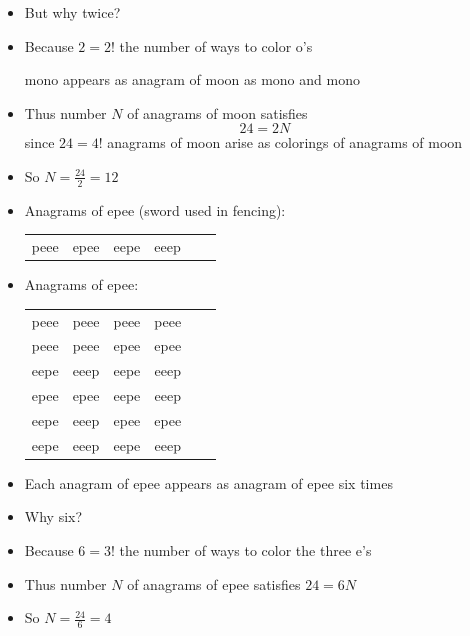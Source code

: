 \documentclass[handout]{beamer}
\theoremstyle{definition}
\begin{document}
\begin{frame}
\begin{itemize}
\item But why twice?
\item Because $2=2!$ the number of ways to color o's
\begin{example} mono appears as anagram of mo\alert{o}n
as mon\alert{o} and m\alert{o}no
\end{example}
\item Thus number $N$ of anagrams of moon satisfies
\[24=2N\]
since $24=4!$ anagrams of mo\alert{o}n arise as colorings of
anagrams of moon
\item So $N=\frac{24}{2}=12$
\end{itemize}
\end{frame}

\begin{frame}
\begin{itemize}
\item Anagrams of epee (sword used in fencing):\\
\begin{tabular}{cccccc}
peee&epee&eepe&eeep
\end{tabular}
\item Anagrams of ep{\color{red}e}{\color{blue}e}:\\
\begin{tabular}{cccccc}
pe{\color{red}e}{\color{blue}e}&pe{\color{blue}e}{\color{red}e}&p{\color{red}e}e{\color{blue}e}&p{\color{red}e}{\color{blue}e}e\\
p{\color{blue}e}e{\color{red}e}&p{\color{blue}e}{\color{red}e}e&ep{\color{red}e}{\color{blue}e}&ep{\color{blue}e}{\color{red}e}\\
e{\color{red}e}p{\color{blue}e}&e{\color{red}e}{\color{blue}e}p&e{\color{blue}e}p{\color{red}e}&e{\color{blue}e}{\color{red}e}p\\
{\color{red}e}pe{\color{blue}e}&{\color{red}e}p{\color{blue}e}e&{\color{red}e}ep{\color{blue}e}&{\color{red}e}e{\color{blue}e}p\\
{\color{red}e}{\color{blue}e}pe&{\color{red}e}{\color{blue}e}ep&{\color{blue}e}pe{\color{red}e}&{\color{blue}e}p{\color{red}e}e\\
{\color{blue}e}ep{\color{red}e}&{\color{blue}e}e{\color{red}e}p&{\color{blue}e}{\color{red}e}pe&{\color{blue}e}{\color{red}e}ep
\end{tabular}
\item Each anagram of epee appears as anagram of
ep{\color{red}e}{\color{blue}e}
\alert{six} times
\item Why six?
\item Because $6=3!$ the number of ways to color the three e's
\item Thus number $N$ of anagrams of epee satisfies $24=6N$
\item So $N=\frac{24}{6}=4$
\end{itemize}
\end{frame}
\end{document}
